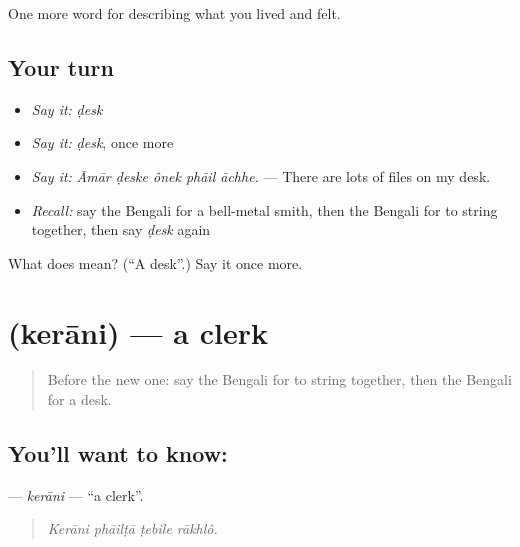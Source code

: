 \begin{grammarlens}[title={What you've built}]
One more word for describing what you lived and felt.
\end{grammarlens}

\subsection*{Your turn}
\begin{itemize}
\raggedright
  \item \emph{Say it:} \emph{ḍesk}
  \item \emph{Say it:} \emph{ḍesk}, once more
  \item \emph{Say it:} \emph{Āmār ḍeske ônek phāil āchhe.} — There are lots of files on my desk.
  \item \emph{Recall:} say the Bengali for a bell-metal smith, then the Bengali for to string together, then say \emph{ḍesk} again
\end{itemize}

\begin{tcolorbox}[breakable,colback=teal!4,colframe=teal!35!black,title={Before you move on}]
What does  mean? (\textquotedblleft{}A desk\textquotedblright{}.) Say it once more.
\end{tcolorbox}
\section[\texorpdfstring{\bn{কেরানি} (kerāni)}{কেরানি (kerāni)}]{ (kerāni) — a clerk}

\label{lesson:BN-C493-kerani}



\begin{quote}
Before the new one: say the Bengali for to string together, then the Bengali for a desk.
\end{quote}

\subsection*{You'll want to know: }
\textbf{} — \emph{kerāni} — \textquotedblleft{}a clerk\textquotedblright{}.

\begin{quote}
   
\end{quote}

\begin{quote}
\emph{Kerāni phāilṭā ṭebile rākhlô.}
\end{quote}

